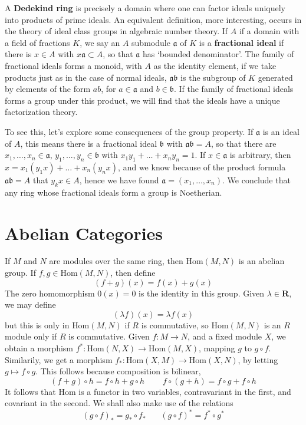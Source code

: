 A {\bf Dedekind ring} is precisely a domain where one can factor ideals uniquely into products of prime ideals. An equivalent definition, more interesting, occurs in the theory of ideal class groups in algebraic number theory. If $A$ if a domain with a field of fractions $K$, we say an $A$ submodule $\mathfrak{a}$ of $K$ is a {\bf fractional ideal} if there is $x \in A$ with $x \mathfrak{a} \subset A$, so that $\mathfrak{a}$ has `bounded denominator'. The family of fractional ideals forms a monoid, with $A$ as the identity element, if we take products just as in the case of normal ideals, $\mathfrak{ab}$ is the subgroup of $K$ generated by elements of the form $ab$, for $a \in \mathfrak{a}$ and $b \in \mathfrak{b}$. If the family of fractional ideals forms a group under this product, we will find that the ideals have a unique factorization theory.

To see this, let's explore some consequences of the group property. If $\mathfrak{a}$ is an ideal of $A$, this means there is a fractional ideal $\mathfrak{b}$ with $\mathfrak{ab} = A$, so that there are $x_1, \dots, x_n \in \mathfrak{a}$, $y_1, \dots, y_n \in \mathfrak{b}$ with $x_1y_1 + \dots + x_ny_n = 1$. If $x \in \mathfrak{a}$ is arbitrary, then $x = x_1 (y_1 x) + \dots + x_n (y_n x)$, and we know because of the product formula $\mathfrak{ab} = A$ that $y_k x \in A$, hence we have found $\mathfrak{a} = (x_1, \dots, x_n)$. We conclude that any ring whose fractional ideals form a group is Noetherian.

\section{Abelian Categories}

If $M$ and $N$ are modules over the same ring, then $\text{Hom}(M,N)$ is an abelian group. If $f,g \in \text{Hom}(M,N)$, then define
%
\[ (f + g)(x) = f(x) + g(x) \]
%
The zero homomorphism $0(x) = 0$ is the identity in this group. Given $\lambda \in \mathbf{R}$, we may define
%
\[ (\lambda f)(x) = \lambda f(x) \]
%
but this is only in $\text{Hom}(M,N)$ if $R$ is commutative, so $\text{Hom}(M,N)$ is an $R$ module only if $R$ is commutative. Given $f: M \to N$, and a fixed module $X$, we obtain a morphism $f^*: \text{Hom}(N,X) \to \text{Hom}(M,X)$, mapping $g$ to $g \circ f$. Similarily, we get a morphism $f_*: \text{Hom}(X,M) \to \text{Hom}(X,N)$, by letting $g \mapsto f \circ g$. This follows because composition is bilinear,
%
\[ (f + g) \circ h = f \circ h + g \circ h\ \ \ \ \ \ \ \ \ \ f \circ (g + h) = f \circ g + f \circ h \]
It follows that $\text{Hom}$ is a functor in two variables, contravariant in the first, and covariant in the second. We shall also make use of the relations
%
\[ (g \circ f)_* = g_* \circ f_*\ \ \ \ \ \ \ \ (g \circ f)^* = f^* \circ g^* \]

